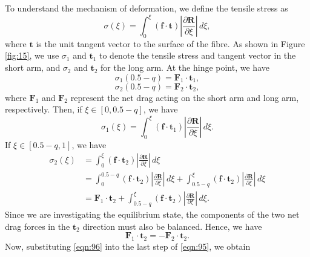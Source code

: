 \documentclass[lineno]{JFM-FLM_Au}
\begin{document}
\newpage
To understand the mechanism of deformation, we define the tensile stress as 
\begin{equation}
	\label{eqn:91}
	\sigma(\xi)=\int_0^\xi (\mathbf{f}\cdot\mathbf{t}) \left |\frac{\partial \mathbf{R}}{\partial \xi}\right|\,d\xi,
\end{equation}
where $\mathbf{t}$ is the unit tangent vector to the surface of the fibre. As shown in Figure \ref{fig:15}, we use $\sigma_1$ and $\mathbf{t}_1$ to denote the tensile stress and tangent vector in the short arm, and $\sigma_2$ and $\mathbf{t}_2$ for the long arm. At the hinge point, we have 
\begin{equation}
	\label{eqn:92}
	\sigma_1(0.5-q)=\mathbf{F}_1\cdot\mathbf{t}_1, 
\end{equation}
\begin{equation}
	\label{eqn:93}
	\sigma_2(0.5-q)=\mathbf{F}_2\cdot\mathbf{t}_2, 
\end{equation}
where $\mathbf{F}_1$ and $\mathbf{F}_2$ represent the net drag acting on the short arm and long arm, respectively. Then, if $\xi \in [0,0.5-q]$, we have 
\begin{equation}
	\label{eqn:94}
	\sigma_1(\xi)= \int_0^\xi (\mathbf{f}\cdot\mathbf{t}_1) \left |\frac{\partial \mathbf{R}}{\partial \xi}\right|\,d\xi.
\end{equation}
If $\xi \in [0.5-q,1]$, we have
\begin{equation}
	\label{eqn:95}
	\begin{aligned}
		\sigma_2(\xi)&= \int_0^\xi (\mathbf{f}\cdot\mathbf{t}_2) \left |\frac{\partial \mathbf{R}}{\partial \xi}\right|\,d\xi\\
		&=\int_0^{0.5-q} (\mathbf{f}\cdot\mathbf{t}_2) \left |\frac{\partial \mathbf{R}}{\partial \xi}\right|\,d\xi+\int_{0.5-q}^\xi (\mathbf{f}\cdot\mathbf{t}_2) \left |\frac{\partial \mathbf{R}}{\partial \xi}\right|\,d\xi\\
		&=\mathbf{F}_1\cdot\mathbf{t}_2+\int_{0.5-q}^\xi (\mathbf{f}\cdot\mathbf{t}_2) \left |\frac{\partial \mathbf{R}}{\partial \xi}\right|\,d\xi.
	\end{aligned}
\end{equation}
Since we are investigating the equilibrium state, the components of the two net drag forces in the $\mathbf{t}_2$ direction must also be balanced. Hence, we have 
\begin{equation}
	\label{eqn:96}
	\mathbf{F}_1\cdot\mathbf{t}_2=-\mathbf{F}_2\cdot\mathbf{t}_2.
\end{equation}
Now, substituting \eqref{eqn:96} into the last step of \eqref{eqn:95}, we obtain 
\end{document}
